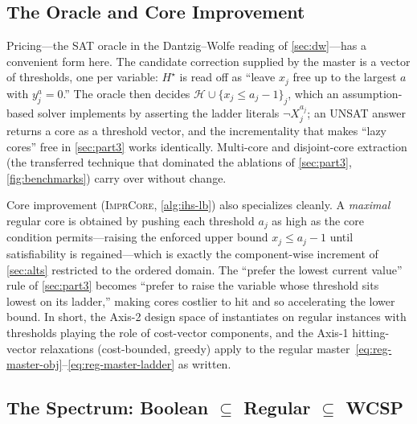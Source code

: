 \subsection{The Oracle and Core Improvement}
\label{sec:regular-oracle}

Pricing---the SAT oracle in the Dantzig--Wolfe reading of \cref{sec:dw}---has a
convenient form here. The candidate correction supplied by the master is a
vector of thresholds, one per variable: $H^\star$ is read off as ``leave $x_j$
free up to the largest $a$ with $y_j^{a}=0$.'' The oracle then decides
$\mathcal{H} \cup \{x_j \le a_j-1\}_j$, which an assumption-based solver
implements by asserting the ladder literals $\neg X_j^{a_j}$; an UNSAT answer
returns a core as a threshold vector, and the incrementality that makes ``lazy
cores'' free in \cref{sec:part3} works identically. Multi-core and disjoint-core
extraction (the transferred technique that dominated the ablations of
\cref{sec:part3}, \cref{fig:benchmarks}) carry over without change.

Core improvement (\textsc{ImprCore}, \cref{alg:ihs-lb}) also specializes
cleanly. A \emph{maximal} regular core is obtained by pushing each threshold
$a_j$ as high as the core condition permits---raising the enforced upper bound
$x_j \le a_j-1$ until satisfiability is regained---which is exactly the
component-wise increment of \cref{sec:alts} restricted to the ordered domain.
The ``prefer the lowest current value'' rule of \cref{sec:part3} becomes
``prefer to raise the variable whose threshold sits lowest on its ladder,''
making cores costlier to hit and so accelerating the lower bound. In short, the
Axis-2 design space of \citet{petrova2025empirical} instantiates on regular
instances with thresholds playing the role of cost-vector components, and the
Axis-1 hitting-vector relaxations (cost-bounded, greedy) apply to the regular
master~\eqref{eq:reg-master-obj}--\eqref{eq:reg-master-ladder} as written.

\subsection{The Spectrum: Boolean \texorpdfstring{$\subseteq$}{<=} Regular \texorpdfstring{$\subseteq$}{<=} WCSP}
\label{sec:regular-spectrum}

